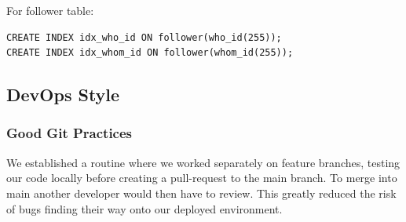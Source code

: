 \documentclass{article}
\begin{document}
For follower table:
\begin{verbatim}
CREATE INDEX idx_who_id ON follower(who_id(255));
CREATE INDEX idx_whom_id ON follower(whom_id(255));
\end{verbatim}

\subsection{DevOps Style}

\subsubsection{Good Git Practices}
We established a routine where we worked separately on feature branches, testing our code locally before creating a pull-request to the main branch. To merge into main another developer would then have to review. This greatly reduced the risk of bugs finding their way onto our deployed environment.
\end{document}
